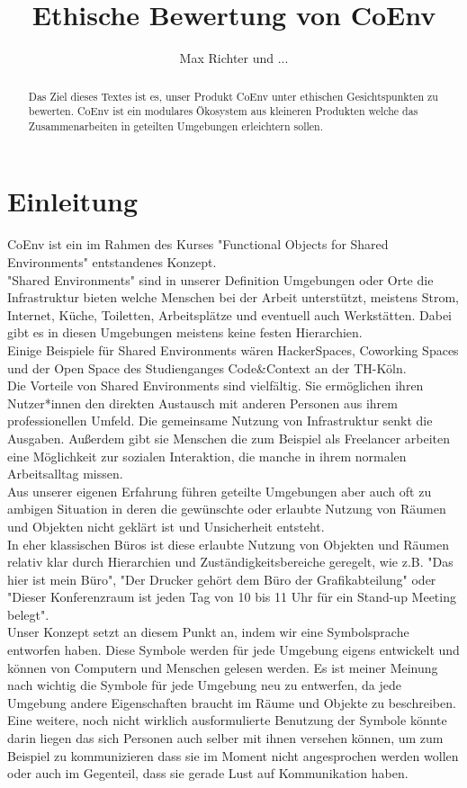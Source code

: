 \documentclass{article}
\title{Ethische Bewertung von CoEnv}
\author{Max Richter und ...}
\begin{document}
\maketitle

\begin{abstract}
Das Ziel dieses Textes ist es, unser Produkt CoEnv unter ethischen Gesichtspunkten zu bewerten. CoEnv ist ein modulares Ökosystem aus kleineren Produkten welche das Zusammenarbeiten in geteilten Umgebungen erleichtern sollen.
\end{abstract}

\newpage
\tableofcontents
\newpage

\section{Einleitung}

CoEnv ist ein im Rahmen des Kurses "Functional Objects for Shared Environments" entstandenes Konzept.
\\[2ex]
"Shared Environments" sind in unserer Definition Umgebungen oder Orte die Infrastruktur bieten welche Menschen bei der Arbeit unterstützt, meistens Strom, Internet, Küche, Toiletten, Arbeitsplätze und eventuell auch Werkstätten. Dabei gibt es in diesen Umgebungen meistens keine festen Hierarchien.
\\[2ex]
Einige Beispiele für Shared Environments wären HackerSpaces, Coworking Spaces und der Open Space des Studienganges Code\&Context an der TH-Köln.
\\[2ex]
Die Vorteile von Shared Environments sind vielfältig. Sie ermöglichen ihren Nutzer*innen den direkten Austausch mit anderen Personen aus ihrem professionellen Umfeld. Die gemeinsame Nutzung von Infrastruktur senkt die Ausgaben. Außerdem gibt sie Menschen die zum Beispiel als Freelancer arbeiten eine Möglichkeit zur sozialen Interaktion, die manche in ihrem normalen Arbeitsalltag missen.
\\[2ex]
Aus unserer eigenen Erfahrung führen geteilte Umgebungen aber auch oft zu ambigen Situation in deren die gewünschte oder erlaubte Nutzung von Räumen und Objekten nicht geklärt ist und Unsicherheit entsteht.
\\[2ex]
In eher klassischen Büros ist diese erlaubte Nutzung von Objekten und Räumen relativ klar durch Hierarchien und Zuständigkeitsbereiche geregelt, wie z.B. "Das hier ist mein Büro", "Der Drucker gehört dem Büro der Grafikabteilung" oder "Dieser Konferenzraum ist jeden Tag von 10 bis 11 Uhr für ein Stand-up Meeting belegt".
\\[2ex]
Unser Konzept setzt an diesem Punkt an, indem wir eine Symbolsprache entworfen haben. Diese Symbole werden für jede Umgebung eigens entwickelt und können von Computern und Menschen gelesen werden. Es ist meiner Meinung nach wichtig die Symbole für jede Umgebung neu zu entwerfen, da jede Umgebung andere Eigenschaften braucht im Räume und Objekte zu beschreiben.
\\[2ex]
Eine weitere, noch nicht wirklich ausformulierte Benutzung der Symbole könnte darin liegen das sich Personen auch selber mit ihnen versehen können, um zum Beispiel zu kommunizieren dass sie im Moment nicht angesprochen werden wollen oder auch im Gegenteil, dass sie gerade Lust auf Kommunikation haben. 
\end{document}
